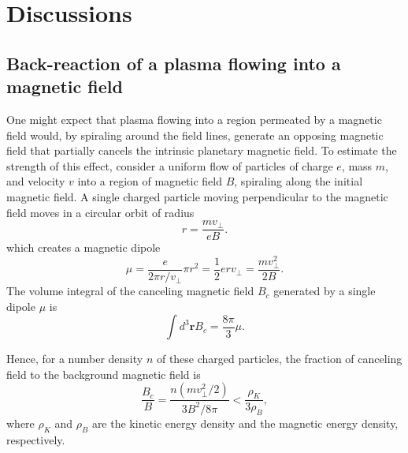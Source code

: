 \documentclass{emulateapj}
\begin{document}
\section{Discussions}
\label{s:discussion}





\subsection{Back-reaction of a plasma flowing into a magnetic field}
\label{ss:offset}

One might expect that plasma flowing into a region permeated by a magnetic field would, by spiraling around the field lines, generate an opposing magnetic field that partially cancels the intrinsic planetary magnetic field. 
To estimate the strength of this effect, consider a uniform flow of particles of charge $e$, mass $m$, and velocity $v$ into a region of magnetic field $B$, spiraling along the initial magnetic field. 
A single charged particle moving perpendicular to the magnetic field moves in a circular orbit of radius 
\begin{equation}
r=\frac{mv_\bot }{eB}.
\end{equation}
which creates a magnetic dipole
\begin{equation}
\mu = \frac{e}{2\pi r/v_\bot} \pi r^2 = \frac{1}{2} e r v_\bot = \frac{mv_\bot^2}{2B}.
\end{equation}
The volume integral of the canceling magnetic field $B_c$ generated by a single dipole $\mu$ is
\begin{equation}
\int d^3{\boldsymbol r} B_c = \frac{8\pi}{3} \mu.
\end{equation}

Hence, for a number density $n$ of these charged particles, the fraction of canceling field to the background magnetic field is
\begin{equation}
\frac{B_c}{B} = \frac{n(mv_\bot^2/2)}{3 B^2/8\pi} < \frac{\rho_K}{3\rho_B},
\end{equation}
where $\rho_K$ and $\rho_B$ are the kinetic energy density and the magnetic energy density, respectively. 
\end{document}
